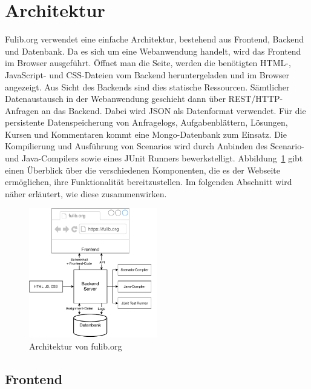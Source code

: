 \section{Architektur}\label{sec:architecture}

Fulib.org verwendet eine einfache Architektur, bestehend aus Frontend, Backend und Datenbank.
Da es sich um eine Webanwendung handelt, wird das Frontend im Browser ausgeführt.
Öffnet man die Seite, werden die benötigten HTML-, JavaScript- und CSS-Dateien vom Backend heruntergeladen und im Browser angezeigt.
Aus Sicht des Backends sind dies statische Ressourcen.
Sämtlicher Datenaustausch in der Webanwendung geschieht dann über REST/HTTP-Anfragen an das Backend.
Dabei wird JSON als Datenformat verwendet.
Für die persistente Datenspeicherung von Anfragelogs, Aufgabenblättern, Lösungen, Kursen und Kommentaren kommt eine Mongo\cite{mongodb}-Datenbank zum Einsatz.
Die Kompilierung und Ausführung von Scenarios wird durch Anbinden des Scenario- und Java-Compilers sowie eines JUnit Runners bewerkstelligt.
Abbildung~\ref{fig:website-architecture} gibt einen Überblick über die verschiedenen Komponenten,
die es der Webseite ermöglichen, ihre Funktionalität bereitzustellen.
Im folgenden Abschnitt wird näher erläutert, wie diese zusammenwirken.

\begin{figure}
    \centering
    \includegraphics[width=0.5\textwidth]{chapter/fulib.org/img/architecture.pdf}
    \caption{Architektur von fulib.org}
    \label{fig:website-architecture}
\end{figure}

\subsection{Frontend}\label{subsec:frontend}

